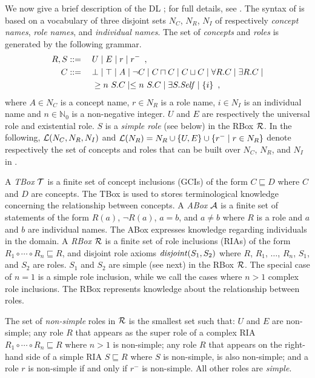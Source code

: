 \documentclass[
]{ceurart}
\begin{document}
We now give a brief description of the DL \SROIQ; for full details, see \cite{baader_horrocks_lutz_sattler_2017,HorrocksKutzSattlerKR2006}. The syntax of \SROIQ is based on a vocabulary of three disjoint sets $N_C$, $N_R$, $N_I$ of respectively \emph{concept names}, \emph{role names}, and \emph{individual names}. The set of \SROIQ \emph{concepts} and \emph{roles} is generated by the following grammar.
\begin{alignat*}{2}
  R, S &::={} && U \mid E \mid r \mid r^{-} \enspace,\\
  C &::= && \bot \mid \top \mid A \mid \neg C \mid C \sqcap C \mid C \sqcup C \mid \forall R.C \mid \exists R.C \mid \\ 
  &&& \geq n~S.C \mid \leq n~S.C \mid \exists S.\mathit{Self} \mid \{i\} \enspace,
\end{alignat*}
where $A \in N_C$ is a concept name, $r \in N_R$ is a role name, $i \in N_I$ is an individual name and $n \in \mathbb{N}_0$ is a non-negative integer. $U$ and $E$ are respectively the universal role and existential role. $S$ is a \emph{simple role} (see below) in the RBox $\mathcal{R}$. In the following, $\mathcal{L}(N_C, N_R, N_I)$ and $\mathcal{L}(N_R) = N_R \cup \{U, E\} \cup \{r^- \mid r \in N_R\}$ denote respectively the set of concepts and roles that can be built over $N_C$, $N_R$, and $N_I$ in \SROIQ.

A \emph{TBox} $\mathcal{T}$ is a finite set of concept inclusions (GCIs) of the form $C \sqsubseteq D$ where $C$ and $D$ are concepts. The TBox is used to stores terminological knowledge concerning the relationship between concepts. A \emph{ABox} $\mathcal{A}$ is a finite set of statements of the form $R(a)$, $\lnot R (a)$, $a = b$, and $a \not= b$ where $R$ is a role and $a$ and $b$ are individual names. The ABox expresses knowledge regarding individuals in the domain. A \emph{RBox} $\mathcal{R}$ is a finite set of role inclusions (RIAs) of the form $R_1 \circ \cdots \circ R_n \sqsubseteq R$, and disjoint role axioms $\mathit{disjoint}(S_1, S_2)$ where $R$, $R_1$, $\dots$, $R_n$, $S_1$, and $S_2$ are roles. $S_1$ and $S_2$ are simple (see next) in the RBox $\mathcal{R}$. The special case of $n = 1$ is a simple role inclusion, while we call the cases where $n > 1$ complex role inclusions. The RBox represents knowledge about the relationship between roles.

The set of \emph{non-simple} roles in $\mathcal{R}$ is the smallest set such that: $U$ and $E$ are non-simple; any role $R$ that appears as the super role of a complex RIA $R_1 \circ \cdots \circ R_n \sqsubseteq R$ where $n > 1$ is non-simple; any role $R$ that appears on the right-hand side of a simple RIA $S \sqsubseteq R$ where $S$ is non-simple, is also non-simple; and a role $r$ is non-simple if and only if $r^-$ is non-simple.
All other roles are \emph{simple}.
\end{document}
